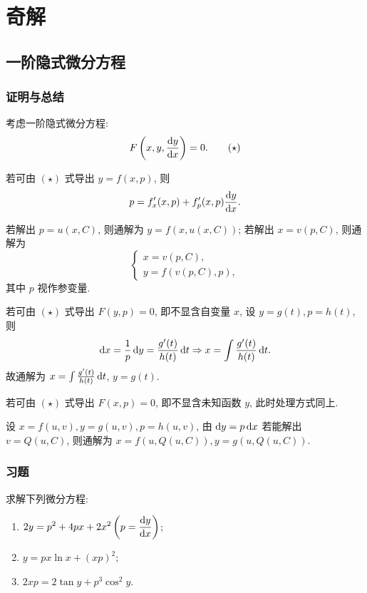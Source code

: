 \chapter{奇解}



\section{一阶隐式微分方程}



\subsection{证明与总结}



考虑一阶隐式微分方程:
\begin{equation}
  F\left(x,y,\frac{\mathop{}\!\mathrm{d} y}{\mathop{}\!\mathrm{d} x}\right)=0.  \tag{$\star$}
\end{equation}

\textbullet 若可由 $(\star)$ 式导出 $y=f(x,p)$, 则
\[p=f'_x(x,p)+f'_p(x,p)\frac{\mathop{}\!\mathrm{d} y}{\mathop{}\!\mathrm{d} x}.\]

若解出 $p=u(x,C)$, 则通解为 $y=f(x,u(x,C))$;
若解出 $x=v(p,C)$, 则通解为
\[\begin{cases}
  x=v(p,C), \\ y=f(v(p,C),p),
\end{cases}\]
其中 $p$ 视作参变量.

\textbullet 若可由 $(\star)$ 式导出 $F(y,p)=0$, 即不显含自变量 $x$, 
设 $y=g(t),p=h(t)$, 则
\[\mathop{}\!\mathrm{d} x=\frac{1}{p}\mathop{}\!\mathrm{d} y=\frac{g'(t)}{h(t)}\mathop{}\!\mathrm{d} t\Rightarrow x=\int\frac{g'(t)}{h(t)}\mathop{}\!\mathrm{d} t.\]
故通解为 $x=\int\frac{g'(t)}{h(t)}\mathop{}\!\mathrm{d} t$, $y=g(t)$.

\textbullet 若可由 $(\star)$ 式导出 $F(x,p)=0$, 即不显含未知函数 $y$, 此时处理方式同上.

\textbullet 设 $x=f(u,v),y=g(u,v),p=h(u,v)$, 由 $\mathop{}\!\mathrm{d} y=p\mathop{}\!\mathrm{d} x$ 若能解出 $v=Q(u,C)$, 
则通解为 $x=f(u,Q(u,C)),y=g(u,Q(u,C))$.



\subsection{习题}



\begin{exercise}
  求解下列微分方程:
  \begin{enumerate}[(1)]
  \item $\displaystyle 2y=p^2+4px+2x^2\left(p=\frac{\mathop{}\!\mathrm{d} y}{\mathop{}\!\mathrm{d} x}\right)$;
  \item $\displaystyle y=px\ln x+(xp)^2$;
  \item $\displaystyle 2xp=2\tan y+p^3\cos^2y$.
  \end{enumerate}
\end{exercise}

